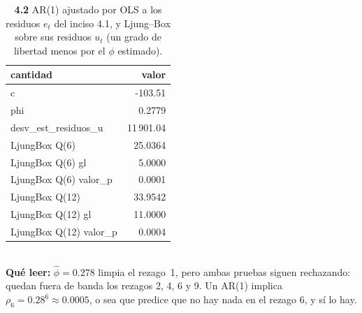 \begin{table}[htbp]
\centering
\footnotesize
\caption{\textbf{4.2} AR(1) ajustado por OLS a los residuos $e_t$ del inciso 4.1, y Ljung--Box sobre sus residuos $u_t$ (un grado de libertad menos por el $\phi$ estimado).}
\label{tab:p4_ar1}
\begin{tabular}{lr}
\toprule
\textbf{cantidad} & \textbf{valor} \\
\midrule
c & -103.51 \\
phi & 0.2779 \\
desv\_est\_residuos\_u & 11\,901.04 \\
LjungBox Q(6) & 25.0364 \\
LjungBox Q(6) gl & 5.0000 \\
LjungBox Q(6) valor\_p & 0.0001 \\
LjungBox Q(12) & 33.9542 \\
LjungBox Q(12) gl & 11.0000 \\
LjungBox Q(12) valor\_p & 0.0004 \\
\bottomrule
\end{tabular}
\\[0.3em]{\scriptsize \textbf{Qu\'e leer:} $\hat\phi=0.278$ limpia el rezago~1, pero ambas pruebas siguen rechazando: quedan fuera de banda los rezagos 2, 4, 6 y 9. Un AR(1) implica $\rho_6=0.28^6\approx0.0005$, o sea que predice que no hay nada en el rezago 6, y s\'i lo hay.}
\end{table}
